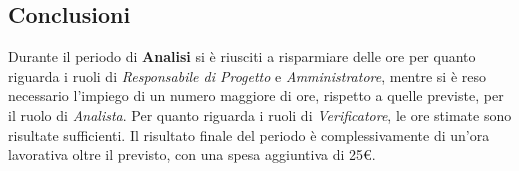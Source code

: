 	\subsection{Conclusioni}
	Durante il periodo di \textbf{Analisi} si è riusciti a risparmiare delle ore per quanto riguarda i ruoli di \textit{Responsabile di Progetto} e \textit{Amministratore}, mentre si è reso necessario l'impiego di un numero maggiore di ore, rispetto a quelle previste, per il ruolo di \textit{Analista}. Per quanto riguarda i ruoli di \textit{Verificatore}, le ore stimate sono risultate sufficienti. Il risultato finale del periodo è complessivamente di un'ora lavorativa oltre il previsto, con una spesa aggiuntiva di 25€.